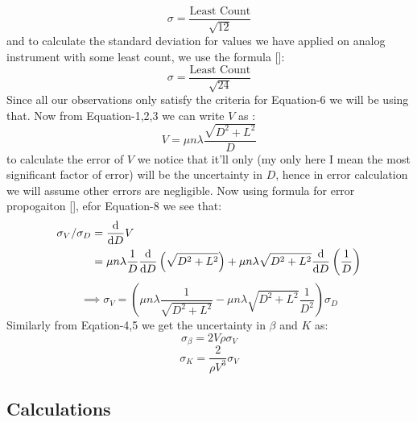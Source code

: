 \documentclass[%
sor,
 jor,
 amsmath,amssymb,
 reprint,
longbibliography,
]{revtex4-2}
\begin{document}
\begin{equation}
\sigma = \frac{\text{Least Count}}{\sqrt{12}}
\end{equation}
and to calculate the standard deviation for values we have applied on analog instrument with some least count, we use the formula [\cite{tewari_uncertainty}]: 
\begin{equation}
\sigma = \frac{\text{Least Count}}{\sqrt{24}}
\end{equation}
Since all our observations only satisfy the criteria for Equation-6 we will be using that. Now from Equation-1,2,3 we can write $V$ as : 
\begin{equation}
	V = \mu n\lambda \frac{\sqrt{{D^2+L^2}}}{D}
\end{equation}
to calculate the error of $V$ we notice that it'll only (my only here I mean the most significant factor of error) will be the uncertainty in $D$, hence in error calculation we will assume other errors are negligible.
Now using formula for error propogaiton [\cite{taylor_error_analysis}], efor Equation-8 we see that: 
\begin{align*}
	\sigma_V / \sigma_D &=  \frac {\text d}{\text d D} V\\
		 &= \mu n \lambda \frac 1 D\frac {\text d}{\text d D}  \left( \sqrt{D^2+L^2} \right) + \mu n \lambda \sqrt{D^2+L^2}\frac {\text d}{\text d D}  \left( \frac 1 D \right) 
\end{align*}
\begin{equation}
	\implies \sigma_V	 =\boxed{\left( \mu n \lambda \frac {1}{\sqrt{D^2+L^2}} - \mu n \lambda \sqrt{D^2+L^2}\frac {1}{D^2} \right) \sigma_D}
\end{equation}
Similarly from Eqation-4,5 we get the uncertainty in $\beta$ and $K$ as:
\begin{equation}
	\sigma_\beta = 2V\rho \sigma_V
\end{equation}
\begin{equation}
	\sigma_K = \frac {2}{\rho V^3} \sigma_V
\end{equation}

\subsection{Calculations}
\end{document}
